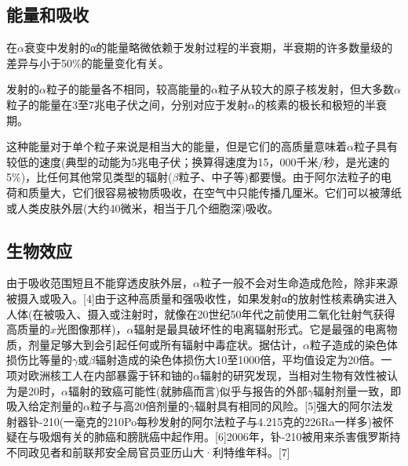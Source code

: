 \subsection{能量和吸收}
在$\alpha$衰变中发射的α的能量略微依赖于发射过程的半衰期，半衰期的许多数量级的差异与小于50\%的能量变化有关。

发射的$\alpha$粒子的能量各不相同，较高能量的$\alpha$粒子从较大的原子核发射，但大多数$\alpha$粒子的能量在3至7兆电子伏之间，分别对应于发射$\alpha$的核素的极长和极短的半衰期。

这种能量对于单个粒子来说是相当大的能量，但是它们的高质量意味着$\alpha$粒子具有较低的速度(典型的动能为5兆电子伏；换算得速度为15，000千米/秒，是光速的5\%)，比任何其他常见类型的辐射($\beta$粒子、中子等)都要慢。由于阿尔法粒子的电荷和质量大，它们很容易被物质吸收，在空气中只能传播几厘米。它们可以被薄纸或人类皮肤外层(大约40微米，相当于几个细胞深)吸收。

\subsection{生物效应}
由于吸收范围短且不能穿透皮肤外层，$\alpha$粒子一般不会对生命造成危险，除非来源被摄入或吸入。[4]由于这种高质量和强吸收性，如果发射α的放射性核素确实进入人体(在被吸入、摄入或注射时，就像在20世纪50年代之前使用二氧化钍射气获得高质量的$x$光图像那样)，$\alpha$辐射是最具破坏性的电离辐射形式。它是最强的电离物质，剂量足够大到会引起任何或所有辐射中毒症状。据估计，$\alpha$粒子造成的染色体损伤比等量的$\gamma$或$\beta$辐射造成的染色体损伤大10至1000倍，平均值设定为20倍。一项对欧洲核工人在内部暴露于钚和铀的$\alpha$辐射的研究发现，当相对生物有效性被认为是20时，$\alpha$辐射的致癌可能性(就肺癌而言)似乎与报告的外部$\gamma$辐射剂量一致，即吸入给定剂量的$\alpha$粒子与高20倍剂量的$\gamma$辐射具有相同的风险。[5]强大的阿尔法发射器钋-210(一毫克的210Po每秒发射的阿尔法粒子与4.215克的226Ra一样多)被怀疑在与吸烟有关的肺癌和膀胱癌中起作用。[6]2006年，钋-210被用来杀害俄罗斯持不同政见者和前联邦安全局官员亚历山大·利特维年科。[7]